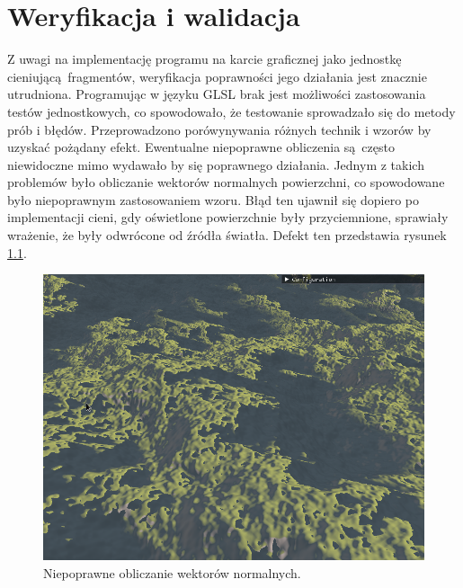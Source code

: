 \chapter{Weryfikacja i walidacja}
\label{ch:06}

Z uwagi na implementację programu na karcie graficznej jako jednostkę cieniującą fragmentów, weryfikacja poprawności jego działania jest znacznie utrudniona. Programując w języku GLSL brak jest możliwości zastosowania testów jednostkowych, co spowodowało, że testowanie sprowadzało się do metody prób i błędów. Przeprowadzono porówynywania różnych technik i wzorów by uzyskać pożądany efekt. Ewentualne niepoprawne obliczenia są często niewidoczne mimo wydawało by się poprawnego działania. Jednym z takich problemów było obliczanie wektorów normalnych powierzchni, co spowodowane było niepoprawnym zastosowaniem wzoru. Błąd ten ujawnił się dopiero po implementacji cieni, gdy oświetlone powierzchnie były przyciemnione, sprawiały wrażenie, że były odwrócone od źródła światła. Defekt ten przedstawia rysunek \ref{fig:normals}.

\begin{figure}[H]
\centering
\includegraphics[width=1\textwidth]{./graf/norm.png}
\caption{Niepoprawne obliczanie wektorów normalnych.}
\label{fig:normals}
\end{figure}


